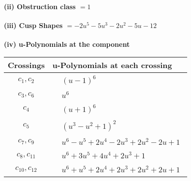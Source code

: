 \documentclass[1p]{elsarticle_modified}
\theoremstyle{definition}
\begin{document}
\flushleft \textbf{(ii) Obstruction class $= 1$}\\~\\
\flushleft \textbf{(iii) Cusp Shapes $= -2 u^5-5 u^3-2 u^2-5 u-12$}\\~\\
\newpage\renewcommand{\arraystretch}{1}
\flushleft \textbf{(iv) u-Polynomials at the component}\newline \\
\begin{tabular}{m{50pt}|m{274pt}}
Crossings & \hspace{64pt}u-Polynomials at each crossing \\
\hline $$\begin{aligned}c_{1},c_{2}\end{aligned}$$&$\begin{aligned}
&(u-1)^6
\end{aligned}$\\
\hline $$\begin{aligned}c_{3},c_{6}\end{aligned}$$&$\begin{aligned}
&u^6
\end{aligned}$\\
\hline $$\begin{aligned}c_{4}\end{aligned}$$&$\begin{aligned}
&(u+1)^6
\end{aligned}$\\
\hline $$\begin{aligned}c_{5}\end{aligned}$$&$\begin{aligned}
&(u^3- u^2+1)^2
\end{aligned}$\\
\hline $$\begin{aligned}c_{7},c_{9}\end{aligned}$$&$\begin{aligned}
&u^6- u^5+2 u^4-2 u^3+2 u^2-2 u+1
\end{aligned}$\\
\hline $$\begin{aligned}c_{8},c_{11}\end{aligned}$$&$\begin{aligned}
&u^6+3 u^5+4 u^4+2 u^3+1
\end{aligned}$\\
\hline $$\begin{aligned}c_{10},c_{12}\end{aligned}$$&$\begin{aligned}
&u^6+u^5+2 u^4+2 u^3+2 u^2+2 u+1
\end{aligned}$\\
\hline
\end{tabular}\\~\\
\end{document}
